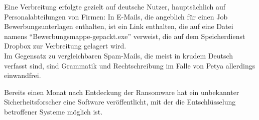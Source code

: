 Eine Verbreitung erfolgte gezielt auf deutsche Nutzer, hauptsächlich auf Personalabteilungen von Firmen: In E-Mails, die angeblich für einen Job Bewerbungsunterlagen enthalten, ist ein Link enthalten, die auf eine Datei namens "`Bewerbungsmappe-gepackt.exe"' verweist, die auf dem Speicherdienst Dropbox zur Verbreitung gelagert wird. \cite{petya:infect} \\
Im Gegensatz zu vergleichbaren Spam-Mails, die meist in krudem Deutsch verfasst sind, sind Grammatik und Rechtschreibung im Falle von Petya allerdings einwandfrei.

Bereits einen Monat nach Entdeckung der Ransomware hat ein unbekannter Sicherheitsforscher eine Software veröffentlicht, mit der die Entschlüsselung betroffener Systeme möglich ist. \cite{petya:end}







